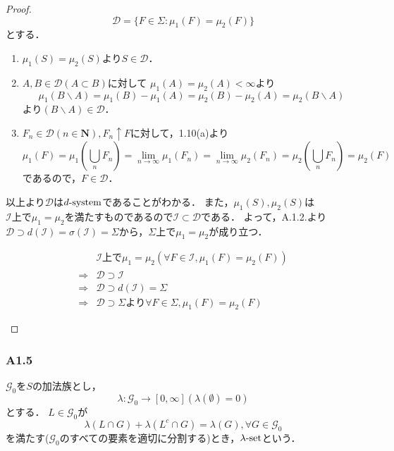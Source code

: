 \documentclass{jsarticle}
\begin{document}
\begin{proof}
    \begin{equation}
        \mathcal{D} = \{F\in\Sigma:\mu_1(F)=\mu_2(F)\} \nonumber
    \end{equation}
    とする．
    \begin{enumerate}
        \item $\mu_1(S)=\mu_2(S)$より$S\in\mathcal{D}$．
        \item $A,B\in\mathcal{D}(A\subset B)$に対して
            $\mu_1(A)=\mu_2(A)<\infty$より
            \begin{equation}
                    \mu_1(B\backslash A)=\mu_1(B)-\mu_1(A)=\mu_2(B)-\mu_2(A)=\mu_2(B\backslash A) \nonumber
            \end{equation}
            より$(B\backslash A)\in\mathcal{D}$．
        \item $F_n\in\mathcal{D}(n\in\mathbf{N}) , F_n\uparrow F$に対して，1.10(a)より
            \begin{equation}
                \mu_1(F)=\mu_1(\bigcup_n F_n)=\lim_{n\to\infty}\mu_1(F_n)=\lim_{n\to\infty}\mu_2(F_n)=\mu_2(\bigcup_n F_n)=\mu_2(F) \nonumber
            \end{equation}
            であるので，$F\in\mathcal{D}$．
    \end{enumerate}
    以上より$\mathcal{D}$は$d{\rm\text{-}system}$であることがわかる．
    また，$\mu_1(S),\mu_2(S)$は$\mathcal{I}上で\mu_1=\mu_2$を満たすものであるので$\mathcal{I}\subset\mathcal{D}$である．
    よって，A.1.2.より$\mathcal{D} \supset d(\mathcal{I}) = \sigma(\mathcal{I}) = \Sigma$から，$\Sigma 上で \mu_1=\mu_2$が成り立つ．
    \begin{itembox}[]{}
        \begin{align}
            &\mathcal{I} 上で \mu_1=\mu_2 (\forall F\in\mathcal{I},\mu_1(F)=\mu_2(F)) \nonumber \\
            \Rightarrow & \mathcal{D}\supset \mathcal{I} \nonumber \\
            \Rightarrow & \mathcal{D}\supset d(\mathcal{I})=\Sigma \nonumber \\
            \Rightarrow & \mathcal{D}\supset\Sigma より \forall F \in \Sigma,\mu_1(F)=\mu_2(F) \nonumber
        \end{align}
    \end{itembox}
\end{proof}

\subsubsection*{A1.5}
$\mathcal{G}_0$を$S$の加法族とし，
\begin{equation}
    \lambda:\mathcal{G}_0\to[0,\infty] (\lambda(\emptyset)=0) \nonumber
\end{equation}
とする．
$L\in\mathcal{G}_0$が
\begin{equation}
    \lambda(L\cap G)+\lambda(L^c\cap G)=\lambda(G),\forall G\in\mathcal{G}_0 \nonumber
\end{equation}
を満たす($\mathcal{G}_0$のすべての要素を適切に分割する)とき，$\lambda{\rm \text{-}set}$という．
\end{document}

